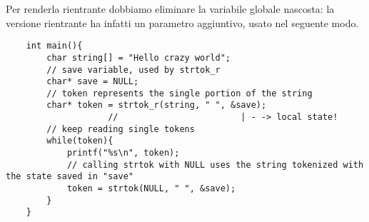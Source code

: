 Per renderla rientrante dobbiamo eliminare la variabile globale nascosta: la versione rientrante  ha infatti un parametro aggiuntivo, usato nel seguente modo.
\begin{verbatim}
    int main(){
        char string[] = "Hello crazy world";
        // save variable, used by strtok_r
        char* save = NULL;
        // token represents the single portion of the string
        char* token = strtok_r(string, " ", &save);
                    //                        | - -> local state!
        // keep reading single tokens
        while(token){
            printf("%s\n", token);
            // calling strtok with NULL uses the string tokenized with the state saved in "save"
            token = strtok(NULL, " ", &save);
        }
    }
\end{verbatim}

